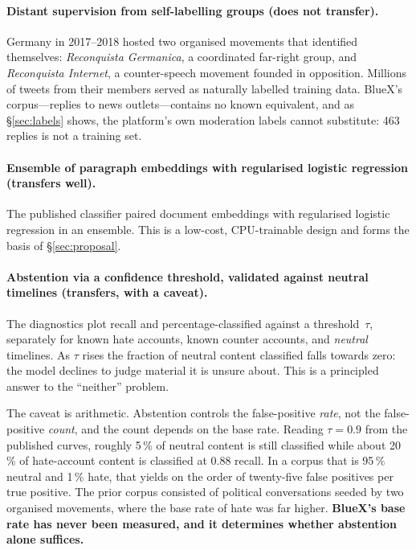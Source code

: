 \documentclass[11pt,a4paper]{article}
\begin{document}
\paragraph{Distant supervision from self-labelling groups (does not transfer).}
Germany in 2017--2018 hosted two organised movements that identified themselves:
\emph{Reconquista Germanica}, a coordinated far-right group, and \emph{Reconquista
Internet}, a counter-speech movement founded in opposition. Millions of tweets from
their members served as naturally labelled training data. BlueX's corpus---replies
to news outlets---contains no known equivalent, and as \S\ref{sec:labels} shows, the
platform's own moderation labels cannot substitute: 463 replies is not a training
set.

\paragraph{Ensemble of paragraph embeddings with regularised logistic regression
(transfers well).} The published classifier paired document embeddings with
regularised logistic regression in an ensemble. This is a low-cost, CPU-trainable
design and forms the basis of \S\ref{sec:proposal}.

\paragraph{Abstention via a confidence threshold, validated against neutral
timelines (transfers, with a caveat).} The diagnostics plot recall and
percentage-classified against a threshold~$\tau$, separately for known hate
accounts, known counter accounts, and \emph{neutral} timelines. As $\tau$ rises the
fraction of neutral content classified falls towards zero: the model declines to
judge material it is unsure about. This is a principled answer to the ``neither''
problem.

The caveat is arithmetic. Abstention controls the false-positive \emph{rate}, not
the false-positive \emph{count}, and the count depends on the base rate. Reading
$\tau = 0.9$ from the published curves, roughly 5\,\% of neutral content is still
classified while about 20\,\% of hate-account content is classified at 0.88 recall.
In a corpus that is 95\,\% neutral and 1\,\% hate, that yields on the order of
twenty-five false positives per true positive. The prior corpus consisted of
political conversations seeded by two organised movements, where the base rate of
hate was far higher. \textbf{BlueX's base rate has never been measured, and it
determines whether abstention alone suffices.}
\end{document}
